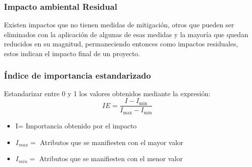 \subsubsection{Impacto ambiental Residual}
Existen impactos que no tienen medidas de mitigación, otros que pueden ser eliminados con la aplicación de algunas de esas medidas y la mayoría que quedan reducidos en su magnitud, permaneciendo entonces como impactos residuales, estos indican el impacto final de un proyecto.
\subsubsection{Índice de importancia estandarizado}
Estandarizar entre 0 y 1 los valores obtenidos mediante la expresión:
\begin{equation}
    IE =\frac{I -I_{\min }}{I_{\max }-I_{\min }}
\end{equation}
\begin{notation}
    \begin{itemize}
        \item I= Importancia obtenido por el impacto
        \item $I_{max}=$ Atributos que se manifiesten con el mayor valor
        \item $I_{min}=$ Atributos que se manifiesten con el menor valor
    \end{itemize}
\end{notation}













